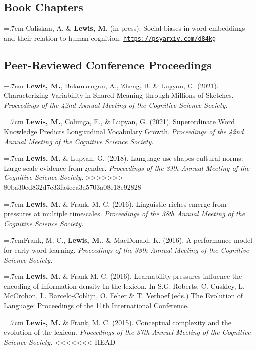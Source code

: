 \documentclass[letterpaper]{article}
\begin{document}
  \subsection*{Book Chapters}

\onehalfspacing



\hangindent=.7cm Caliskan, A. \& {\bf Lewis, M.} (in press). Social biases in word embeddings and their relation to human cognition. \href{hhttps://psyarxiv.com/d84kg}{\tt https://psyarxiv.com/d84kg}

  \subsection*{Peer-Reviewed Conference Proceedings}
  
      \hangindent=.7cm {\bf Lewis, M.},  Balamurugan, A., Zheng, B. \& Lupyan, G. (2021). Characterizing Variability in Shared Meaning through Millions of Sketches.   { \it Proceedings of the 42nd Annual Meeting of the Cognitive Science Society.}
      
 \hangindent=.7cm {\bf Lewis, M.}, Colunga, E., \& Lupyan, G. (2021).  Superordinate Word Knowledge Predicts Longitudinal Vocabulary Growth.  { \it Proceedings of the 42nd Annual Meeting of the Cognitive Science Society.}
          

    \hangindent=.7cm {\bf Lewis, M.} \& Lupyan, G. (2018). Language use shapes cultural norms: Large scale evidence from gender.  { \it Proceedings of the 39th Annual Meeting of the Cognitive Science Society.}
>>>>>>> 80ba30ed832d7c33fa4eca3d5703a08e18e92828

  \hangindent=.7cm {\bf Lewis, M.} \& Frank, M. C. (2016). Linguistic niches emerge from pressures at multiple timescales. { \it Proceedings of the 38th Annual Meeting of the Cognitive Science Society.}

   \hangindent=.7cmFrank, M. C.,  {\bf Lewis, M.}, \& MacDonald, K. (2016). A performance model for early word learning.  { \it Proceedings of the 38th Annual Meeting of the Cognitive Science Society.}

  \hangindent=.7cm {\bf Lewis, M.} \& Frank M. C. (2016). Learnability pressures influence the encoding of information density In the lexicon. In S.G. Roberts, C. Cuskley, L. McCrohon, L. Barcelo-Coblijn, O. Feher \& T. Verhoef (eds.) The Evolution of Language: Proceedings of the 11th International Conference.


 \hangindent=.7cm {\bf Lewis, M.} \& Frank, M. C. (2015). Conceptual complexity and the evolution of the lexicon. { \it Proceedings of the 37th Annual Meeting of the Cognitive Science Society.}
<<<<<<< HEAD
 
\end{document}
